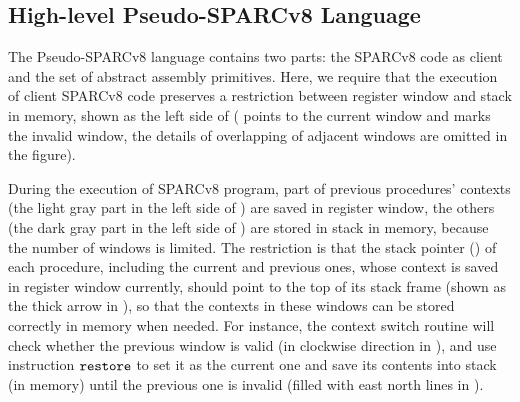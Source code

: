 \subsection{High-level Pseudo-SPARCv8 Language}
\label{subsec:High-level Pseudo-SPARCv8 Language}

The Pseudo-SPARCv8 language contains two parts:
the SPARCv8 code as client
and the set of abstract assembly primitives.
Here, we require that the execution of client SPARCv8 code
preserves a restriction between register
window and stack in memory, shown
as the left side of
\Fig{\ref{fig:Abstraction of Register Windows and Memory}}
(\regcwp{} points to the current window and \regwim{} marks
the invalid window, the details of overlapping
of adjacent windows are omitted in the figure).
\begin{center}
    
    \vspace*{-0.5em}
    \label{fig:Abstraction of Register Windows and Memory}
    \vspace{-0.5em}
\end{center}
During the execution of SPARCv8 program,
part of previous procedures' contexts
(the light gray part in the left side of
\Fig{\ref{fig:Abstraction of Register Windows and Memory}})
are saved in register window, the others
(the dark gray part in the left side of
\Fig{\ref{fig:Abstraction of Register Windows and Memory}})
are stored in stack in memory,
because the number of windows is limited.
The restriction is that the stack pointer
(\spreg{}) of each procedure,
including the current and previous ones,
whose context is saved in register
window currently, should point to the top of its stack frame
(shown as the thick arrow in
\Fig{\ref{fig:Abstraction of Register Windows and Memory}}),
so that the contexts
in these windows can be stored correctly
in memory when needed. For instance,
the context switch routine will check
whether the previous window is valid
(in clockwise direction in
\Fig{\ref{fig:Abstraction of Register Windows and Memory}}),
and use instruction $\texttt{restore}{}$ to set it as the
current one and save its contents into stack
(in memory) until the previous one is invalid
(filled with east north lines
in \Fig{\ref{fig:Abstraction of Register Windows and Memory}}).
